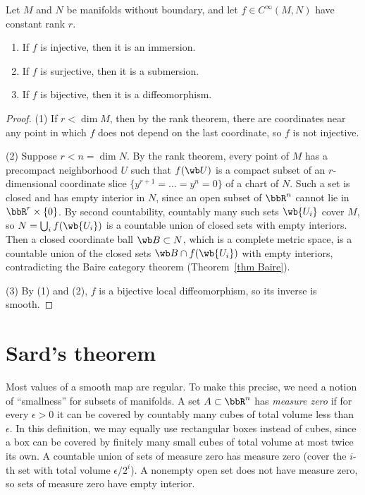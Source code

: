 \begin{thm}\label{Global rank}
    Let $M$ and $N$ be manifolds without boundary, and let $f\in C^\infty(M,N)$ have constant rank $r$.
    \begin{enumerate}
        \item If $f$ is injective, then it is an immersion.
        \item If $f$ is surjective, then it is a submersion.
        \item If $f$ is bijective, then it is a diffeomorphism.
    \end{enumerate}
\end{thm}
\begin{proof}
    (1) If $r<\dim M$, then by the rank theorem, there are coordinates near any point in which $f$ does not depend on the last coordinate, so $f$ is not injective.

    (2) Suppose $r<n=\dim N$. By the rank theorem, every point of $M$ has a precompact neighborhood $U$ such that $f(\wb U)$ is a compact subset of an $r$-dimensional coordinate slice $\{y^{r+1}=\ldots=y^n=0\}$ of a chart of $N$. Such a set is closed and has empty interior in $N$, since an open subset of $\bbR^n$ cannot lie in $\bbR^r\times\{0\}$. By second countability, countably many such sets $\wb{U_i}$ cover $M$, so $N=\bigcup_if(\wb{U_i})$ is a countable union of closed sets with empty interiors. Then a closed coordinate ball $\wb B\subset N$, which is a complete metric space, is a countable union of the closed sets $\wb B\cap f(\wb{U_i})$ with empty interiors, contradicting the Baire category theorem (Theorem~\ref{thm Baire}).

    (3) By (1) and (2), $f$ is a bijective local diffeomorphism, so its inverse is smooth.
\end{proof}


\section{Sard's theorem}\label{sec Sard}

Most values of a smooth map are regular. To make this precise, we need a notion of ``smallness'' for subsets of manifolds. A set $A\subset\bbR^n$ has \emph{measure zero} if for every $\epsilon>0$ it can be covered by countably many cubes of total volume less than $\epsilon$. In this definition, we may equally use rectangular boxes instead of cubes, since a box can be covered by finitely many small cubes of total volume at most twice its own. A countable union of sets of measure zero has measure zero (cover the $i$-th set with total volume $\epsilon/2^i$). A nonempty open set does not have measure zero, so sets of measure zero have empty interior.

